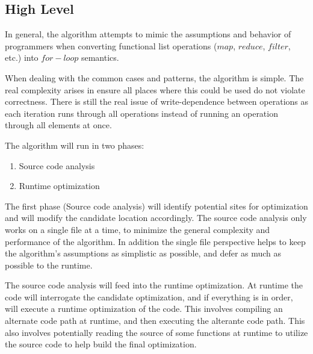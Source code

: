 \subsection{High Level}
In general, the algorithm attempts to mimic the assumptions and behavior of programmers when converting functional list operations ($map$, $reduce$, $filter$, etc.) into $for-loop$ semantics.

When dealing with the common cases and patterns, the algorithm is simple.  The real complexity arises in ensure all places where this could be used do not violate correctness.  There is still the real issue of write-dependence between operations as each iteration runs through all operations instead of running an operation through all elements at once.

The algorithm will run in two phases:
  \begin{enumerate}
    \item Source code analysis
    \item Runtime optimization
  \end{enumerate}

The first phase (Source code analysis) will identify potential sites for optimization and will modify the candidate location accordingly.  The source code analysis only works on a single file at a time, to minimize the general complexity and performance of the algorithm. In addition the single file perspective helps to keep the algorithm's assumptions as simplistic as possible, and defer as much as possible to the runtime.

The source code analysis will feed into the runtime optimization.  At runtime the code will interrogate the candidate optimization, and if everything is in order, will execute a runtime optimization of the code.  This involves compiling an alternate code path at runtime, and then executing the alterante code path.  This also involves potentially reading the source of some functions at runtime to utilize the source code to help build the final optimization.
